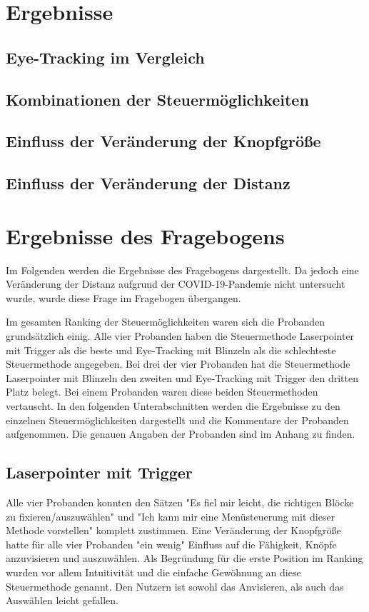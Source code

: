 \section{Ergebnisse}
\subsection{Eye-Tracking im Vergleich}
\subsection{Kombinationen der Steuermöglichkeiten}
\subsection{Einfluss der Veränderung der Knopfgröße}
\subsection{Einfluss der Veränderung der Distanz}
\section{Ergebnisse des Fragebogens}
Im Folgenden werden die Ergebnisse des Fragebogens dargestellt. Da jedoch eine Veränderung der Distanz aufgrund der COVID-19-Pandemie nicht untersucht wurde, wurde diese Frage im Fragebogen übergangen. 

Im gesamten Ranking der Steuermöglichkeiten waren sich die Probanden grundsätzlich einig. Alle vier Probanden haben die Steuermethode Laserpointer mit Trigger als die beste und Eye-Tracking mit Blinzeln als die schlechteste Steuermethode angegeben. Bei drei der vier Probanden hat die Steuermethode Laserpointer mit Blinzeln den zweiten und Eye-Tracking mit Trigger den dritten Platz belegt. Bei einem Probanden waren diese beiden Steuermethoden vertauscht. In den folgenden Unterabschnitten werden die Ergebnisse zu den einzelnen Steuermöglichkeiten dargestellt und die Kommentare der Probanden aufgenommen. Die genauen Angaben der Probanden sind im Anhang  zu finden.
\subsection{Laserpointer mit Trigger}
Alle vier Probanden konnten den Sätzen "Es fiel mir leicht, die richtigen Blöcke zu fixieren/auszuwählen" und "Ich kann mir eine Menüsteuerung mit dieser Methode vorstellen" komplett zustimmen. Eine Veränderung der Knopfgröße hatte für alle vier Probanden "ein wenig" Einfluss auf die Fähigkeit, Knöpfe anzuvisieren und auszuwählen. Als Begründung für die erste Position im Ranking wurden vor allem Intuitivität und die einfache Gewöhnung an diese Steuermethode genannt. Den Nutzern ist sowohl das Anvisieren, als auch das Auswählen leicht gefallen. 
